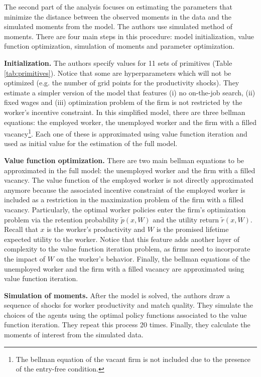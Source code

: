 \documentclass{article}
\begin{document}
The second part of the analysis focuses on estimating the parameters that minimize the distance between the observed moments in the data and the simulated moments from the model. The authors use simulated method of moments. There are four main steps in this procedure: model initialization, value function optimization, simulation of moments and parameter optimization.

\textbf{Initialization.} The authors specify values for 11 sets of primitives (Table \ref{tab:primitives}). Notice that some are hyperparameters which will not be optimized (e.g. the number of grid points for the productivity shocks). They estimate a simpler version of the model that features (i) no on-the-job search, (ii) fixed wages and (iii) optimization problem of the firm is not restricted by the worker's incentive constraint. In this simplified model, there are three bellman equations: the employed worker, the unemployed worker and the firm with a filled vacancy\footnote{The bellman equation of the vacant firm is not included due to the presence of the entry-free condition.}. Each one of these is approximated using value function iteration and used as initial value for the estimation of the full model.

\textbf{Value function optimization.} There are two main bellman equations to be approximated in the full model: the unemployed worker and the firm with a filled vacancy. The value function of the employed worker is not directly approximated anymore because the associated incentive constraint of the employed worker is included as a restriction in the maximization problem of the firm with a filled vacancy. Particularly, the optimal worker policies enter the firm's optimization problem via the retention probability $\tilde{p}(x, W)$ and the utility return $\tilde{r}(x, W)$. Recall that $x$ is the worker's productivity and $W$ is the promised lifetime expected utility to the worker. Notice that this feature adds another layer of complexity to the value function iteration problem, as firms need to incorporate the impact of $W$ on the worker's behavior. Finally, the bellman equations of the unemployed worker and the firm with a filled vacancy are approximated using value function iteration. 

\textbf{Simulation of moments.} After the model is solved, the authors draw a sequence of shocks for worker productivity and match quality. They simulate the choices of the agents using the optimal policy functions associated to the value function iteration. They repeat this process 20 times. Finally, they calculate the moments of interest from the simulated data.
\end{document}
